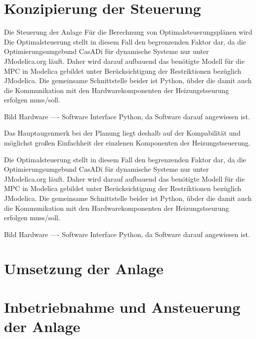 \section{Konzipierung der Steuerung}
Die Steuerung der Anlage 
Für die Berechnung von Optimalsteuerungsplänen wird 
Die Optimalsteuerung stellt in diesem Fall den begrenzenden Faktor dar, da die Optimierungsumgebund CasADi für dynamische Systeme nur unter JModelica.org läuft. Daher wird darauf aufbauend das benötigte Modell für die MPC in Modelica gebildet unter Berücksichtigung der Restriktionen bezüglich JModelica. Die gemeinsame Schnittstelle beider ist Python, übder die damit auch die Kommunikation mit den Hardwarekomponenten der Heizungstseurung erfolgen muss/soll.

Bild Hardware ---- Software   Interface Python, da Software darauf angewiesen ist.



Das Hauptaugenmerk bei der Planung liegt deshalb auf der Kompabilität und möglichst großen Einfachheit der einzlenen Komponenten der Heizungstseuerung. 

Die Optimalsteuerung stellt in diesem Fall den begrenzenden Faktor dar, da die Optimierungsumgebund CasADi für dynamische Systeme nur unter JModelica.org läuft. Daher wird darauf aufbauend das benötigte Modell für die MPC in Modelica gebildet unter Berücksichtigung der Restriktionen bezüglich JModelica. Die gemeinsame Schnittstelle beider ist Python, übder die damit auch die Kommunikation mit den Hardwarekomponenten der Heizungstseurung erfolgen muss/soll.

Bild Hardware ---- Software   Interface Python, da Software darauf angewiesen ist.

\section{Umsetzung der Anlage}


\section{Inbetriebnahme und Ansteuerung der Anlage}

